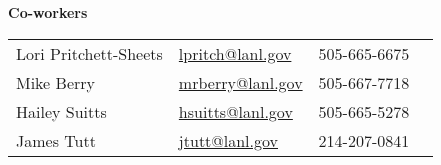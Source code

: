 \begin{minipage}{0.50\textwidth} 
	\begin{center}
		{\normalsize \textbf{Co-workers}} \vspace{1mm} %
	\end{center}
	\begin{tabular}{llll}
		Lori Pritchett-Sheets & \href{mailto:lpritch@lanl.gov}{lpritch@lanl.gov} & 505-665-6675 \\
		Mike Berry       & \href{mailto:mrberry@lanl.gov}{mrberry@lanl.gov} & 505-667-7718 \\
		Hailey Suitts    & \href{mailto:hsuitts@lanl.gov}{hsuitts@lanl.gov} & 505-665-5278 \\
		James Tutt       & \href{mailto:jtutt@lanl.gov}{jtutt@lanl.gov} & 214-207-0841 \\
	\end{tabular}
\end{minipage}





